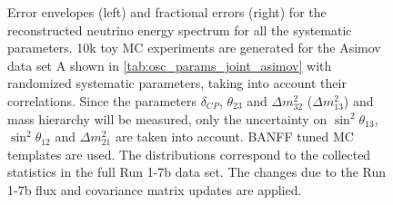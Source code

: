 \begin{figure}[htb]
\caption {
Error envelopes (left) and fractional errors (right) for the reconstructed neutrino energy spectrum
for all the systematic parameters.
10k toy MC experiments are generated for the Asimov data set A shown in \cref{tab:osc_params_joint_asimov}
with randomized systematic parameters, taking into account their correlations.
Since the parameters $\delta_{CP}$, $\theta_{23}$ and $\Delta m^2_{32}$ ($\Delta m^2_{13}$) and mass hierarchy
will be measured,
only the uncertainty on 
$\sin^2 \theta_{13}$,
$\sin^2 \theta_{12}$
and 
$\Delta m^2_{21}$ 
are taken into account.
BANFF tuned MC templates are used. 
The distributions correspond to the collected statistics in the full Run 1-7b data set.
The changes due to the Run 1-7b flux and covariance matrix updates are applied.
}
\label{fig:spectra_systematic_Asimov_A_run17b}
\end{figure}





